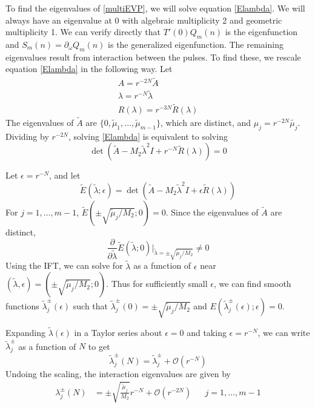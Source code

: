 \documentclass[12pt]{article}
\begin{document}
To find the eigenvalues of \eqref{multiEVP}, we will solve equation \eqref{Elambda}. We will always have an eigenvalue at 0 with algebraic multiplicity 2 and geometric multiplicity 1. We can verify directly that $T'(0) Q_m(n)$ is the eigenfunction and $S_m(n) = \partial_\omega Q_m(n)$ is the generalized eigenfunction. The remaining eigenvalues result from interaction between the pulses. To find these, we rescale equation \eqref{Elambda} in the following way. Let
\begin{align*}
A = r^{-2N} \tilde{A} \\
\lambda = r^{-N} \tilde{\lambda} \\
R(\lambda) = r^{-3N} \tilde{R}(\lambda)
\end{align*}
The eigenvalues of $\tilde{A}$ are $\{0, \tilde{\mu}_1, \dots, \tilde{\mu}_{m-1}\}$, which are distinct, and $\mu_j = r^{-2N} \tilde{\mu_j}$. Dividing by $r^{-2N}$, solving \eqref{Elambda} is equivalent to solving
\[
\det(\tilde{A} - M_2 \tilde{\lambda}^2 I + r^{-N} \tilde{R}(\lambda)) = 0
\]

Let $\epsilon = r^{-N}$, and let
\begin{equation}\label{deftildeE}
\tilde{E}(\tilde{\lambda}; \epsilon) = \det(\tilde{A} - M_2 \tilde{\lambda}^2 I + \epsilon \tilde{R}(\lambda))
\end{equation}
For $j = 1, \dots, m-1$, $\tilde{E}(\pm \sqrt{\tilde{\mu}_j / M_2 }; 0) = 0$. Since the eigenvalues of $\tilde{A}$ are distinct, 
\[
\frac{\partial}{\partial \tilde{\lambda}} \tilde{E}(\tilde{\lambda}; 0)\Big|_{\tilde{\lambda} = \pm \sqrt{\tilde{\mu}_j / M_2 }} \neq 0
\]
Using the IFT, we can solve for $\tilde{\lambda}$ as a function of $\epsilon$ near $(\tilde{\lambda}, \epsilon) = (\pm \sqrt{\tilde{\mu}_j / M_2 }; 0)$. Thus for sufficiently small $\epsilon$, we can find smooth functions $\tilde{\lambda}_j^\pm(\epsilon)$ such that $\tilde{\lambda}_j^\pm(0) = \pm \sqrt{\tilde{\mu}_j / M_2 }$ and $E(\tilde{\lambda}_j^\pm(\epsilon); \epsilon) = 0$. 

Expanding $\tilde{\lambda}(\epsilon)$ in a Taylor series about $\epsilon = 0$ and taking $\epsilon = r^{-N}$, we can write $\tilde{\lambda}_j^\pm$ as a function of $N$ to get 
\begin{equation*}
\tilde{\lambda}_j^\pm(N) = \tilde{\lambda}_j^\pm + \mathcal{O}(r^{-N})
\end{equation*}
Undoing the scaling, the interaction eigenvalues are given by
\begin{align*}
\lambda^\pm_j(N) &= \pm \sqrt{\frac{\tilde{\mu}_j}{M_2}} r^{-N} + \mathcal{O}(r^{-2N}) && j = 1, \dots, m-1 
\end{align*}
\end{document}
